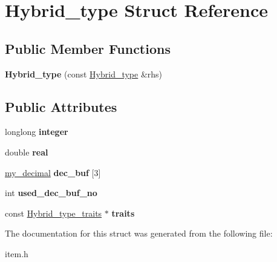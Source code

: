 \hypertarget{structHybrid__type}{}\section{Hybrid\+\_\+type Struct Reference}
\label{structHybrid__type}
\subsection*{Public Member Functions}
\begin{DoxyCompactItemize}
\item 
\mbox{\label{structHybrid__type_aaf5b6915ad5c3b653707c1ffd689ae37}} 
{\bfseries Hybrid\+\_\+type} (const \mbox{\hyperlink{structHybrid__type}{Hybrid\+\_\+type}} \&rhs)
\end{DoxyCompactItemize}
\subsection*{Public Attributes}
\begin{DoxyCompactItemize}
\item 
\mbox{\label{structHybrid__type_a3eec7cbc2be855d006c8a4dc5e1a3245}} 
longlong {\bfseries integer}
\item 
\mbox{\label{structHybrid__type_abd04cb837f41385343f00fd057dc124e}} 
double {\bfseries real}
\item 
\mbox{\label{structHybrid__type_ae23769dc73a63386b683c19512d8d319}} 
\mbox{\hyperlink{classmy__decimal}{my\+\_\+decimal}} {\bfseries dec\+\_\+buf} \mbox{[}3\mbox{]}
\item 
\mbox{\label{structHybrid__type_a29a902ce6f5530c224bd4835b9a1c6c6}} 
int {\bfseries used\+\_\+dec\+\_\+buf\+\_\+no}
\item 
\mbox{\label{structHybrid__type_ae8e871add6a7149eeef8e80c89488d97}} 
const \mbox{\hyperlink{structHybrid__type__traits}{Hybrid\+\_\+type\+\_\+traits}} $\ast$ {\bfseries traits}
\end{DoxyCompactItemize}


The documentation for this struct was generated from the following file\+:\begin{DoxyCompactItemize}
\item 
item.\+h\end{DoxyCompactItemize}
